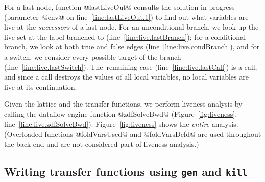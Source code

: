 \documentclass[blockstyle,preprint,natbib,nocopyrightspace]{sigplanconf}
\newcommand\lineref[1]{line~\ref{line:#1}}
\newcommand{\authornote}[1]{{\em #1}}
\def\authornote#1{\unskip\relax}
\newcommand{\simon}[1]{\authornote{SLPJ: #1}}
\newcommand{\norman}[1]{\authornote{NR: #1}}
\let\remark\norman
\newcommand\seclabel[1]{\label{sec:#1}}
\newcommand\figref[1]{Figure~\ref{fig:#1}}
\begin{document}
For a last node, function @lastLiveOut@ consults the solution in
progress (parameter~@env@ on \lineref{lastLiveOut.1}) to find out what
variables are live at the \emph{successors} of a 
last node. 
For an unconditional branch, we look up the live set at the label
branched to (\lineref{live.lastBranch});
for a conditional branch, we look at both true and false edges
(\lineref{live.condBranch}), 
 and
for a switch, we consider every possible target of the
branch (\lineref{live.lastSwitch}).
The~remaining case (\lineref{live.lastCall}) is a call, 
and since a call destroys the values of all local variables, no
local variables are live at its continuation.

Given the lattice and the transfer functions,
we perform liveness analysis by calling
the dataflow-engine function @zdfSolveBwd@ (\figref{liveness},
\lineref{live.zdfSolveBwd}). 
\figref{liveness} shows the \emph{entire} analysis.
(Overloaded functions
@foldVarsUsed@ and @foldVarsDefd@
are used throughout the back end and
are not considered part of liveness analysis.)
\simon{I still want to see their type signatures in a figure somewhere!!
NR: Agreed in principle, but pray suggest where you mean by ``somewhere.''
SLPK: Plus any other non-obvious functions we use but do not define.
NR: Pray enumerate the functions that offend you.
}
%



\ifgenkill
\subsection{Writing transfer functions using {\mdseries\texttt{gen}} and
{\mdseries\texttt{kill}}}



\seclabel{gen-kill}
\end{document}
